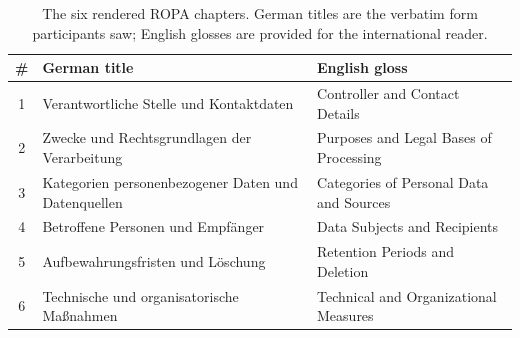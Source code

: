 \begin{table}[htbp]
\centering
\begin{tabularx}{\linewidth}{@{}c X X@{}}
\toprule
\# & German title & English gloss \\
\midrule
1 & Verantwortliche Stelle und Kontaktdaten             & Controller and Contact Details \\
2 & Zwecke und Rechtsgrundlagen der Verarbeitung        & Purposes and Legal Bases of Processing \\
3 & Kategorien personenbezogener Daten und Datenquellen & Categories of Personal Data and Sources \\
4 & Betroffene Personen und Empfänger                   & Data Subjects and Recipients \\
5 & Aufbewahrungsfristen und Löschung                   & Retention Periods and Deletion \\
6 & Technische und organisatorische Maßnahmen           & Technical and Organizational Measures \\
\bottomrule
\end{tabularx}
\caption{The six rendered ROPA chapters. German titles are the
verbatim form participants saw; English glosses are provided for
the international reader.}
\label{tab:ropa-chapters}
\end{table}

